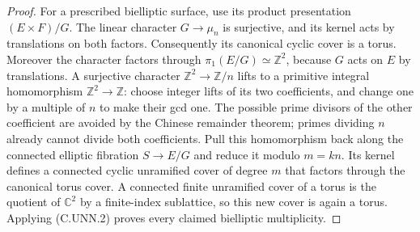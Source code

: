 \begin{proof}
For a prescribed bielliptic surface, use its
product presentation $(E\times F)/G$. The linear
character $G\to\mu_n$ is surjective, and its
kernel acts by translations on both factors.
Consequently its canonical cyclic cover is a
torus. Moreover the character factors through
$\pi_1(E/G)\simeq\mathbb Z^2$, because $G$
acts on $E$ by translations. A surjective
character $\mathbb Z^2\to\mathbb Z/n$ lifts
to a primitive integral homomorphism
$\mathbb Z^2\to\mathbb Z$: choose integer
lifts of its two coefficients, and change one
by a multiple of $n$ to make their gcd one.
The possible prime divisors of the other
coefficient are avoided by the Chinese
remainder theorem; primes dividing $n$ already
cannot divide both coefficients. Pull this
homomorphism back along the connected elliptic
fibration $S\to E/G$ and reduce it modulo
$m=kn$. Its kernel defines a connected cyclic
unramified cover of degree $m$ that factors
through the canonical torus cover. A connected
finite unramified cover of a torus is the
quotient of $\mathbb C^2$ by a finite-index
sublattice, so this new cover is again a
torus. Applying (C.UNN.2) proves every claimed
bielliptic multiplicity.
\end{proof}
